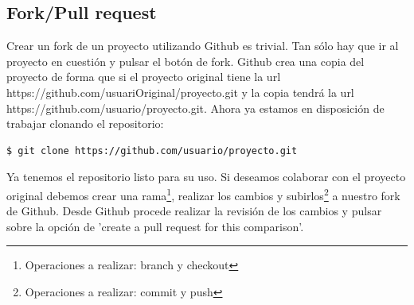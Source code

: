 \subsection{Fork/Pull request}

Crear un fork de un proyecto utilizando Github es trivial. Tan sólo hay que ir al proyecto en cuestión y pulsar el botón de fork. Github crea una copia del proyecto de forma que si el proyecto original tiene la url https://github.com/usuariOriginal/proyecto.git y la copia tendrá la url https://github.com/usuario/proyecto.git. Ahora ya estamos en disposición de trabajar clonando el repositorio:

\begin{lstlisting}[language=bash, numbers=none]
$ git clone https://github.com/usuario/proyecto.git
\end{lstlisting}

Ya tenemos el repositorio listo para su uso. Si deseamos colaborar con el proyecto original debemos crear una rama\footnote{Operaciones a realizar: branch y checkout}, realizar los cambios y subirlos\footnote{Operaciones a realizar: commit y push} a nuestro fork de Github.  Desde Github procede realizar la revisión de los cambios y pulsar sobre la opción de 'create a pull request for this comparison'.

